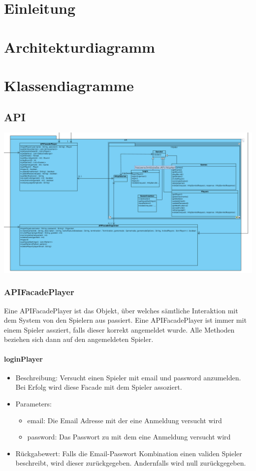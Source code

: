 \documentclass[a4paper]{scrreprt}
\begin{document}
    \tableofcontents
    \chapter{Einleitung}
    \chapter{Architekturdiagramm}

    \chapter{Klassendiagramme}
    \section{API}
    \includegraphics[width=\textwidth]{img/api.png}
    \subsection{APIFacadePlayer}
        Eine APIFacadePlayer ist das Objekt, über welches sämtliche Interaktion mit dem System von den Spielern aus passiert. Eine APIFacadePlayer ist immer mit einem Spieler assziert, falls dieser korrekt angemeldet wurde. Alle Methoden beziehen sich dann auf den angemeldeten Spieler.
    \subsubsection{loginPlayer}
        \begin{itemize}
            \item Beschreibung: Versucht einen Spieler mit email und password anzumelden. Bei Erfolg wird diese Facade mit dem Spieler assoziert.
            \item Parameters: 
                \begin{itemize}
                    \item email: Die Email Adresse mit der eine Anmeldung versucht wird
                    \item password: Das Passwort zu mit dem eine Anmeldung versucht wird
                \end{itemize}
            \item Rückgabewert: Falls die Email-Passwort Kombination einen validen Spieler beschreibt, wird dieser zurückgegeben. Andernfalls wird null zurückgegeben.
        \end{itemize}
\end{document}
